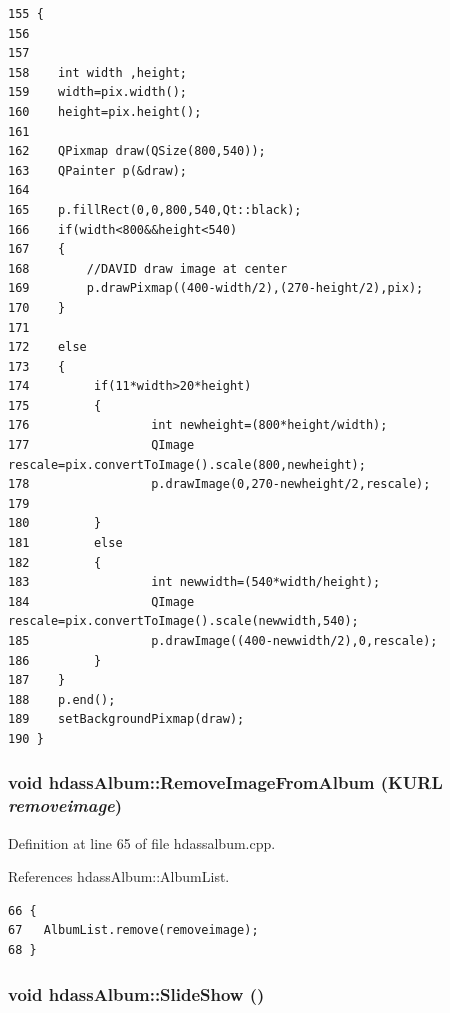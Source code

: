 \footnotesize\begin{verbatim}155 {
156    
157    
158    int width ,height;
159    width=pix.width();
160    height=pix.height();
161    
162    QPixmap draw(QSize(800,540));
163    QPainter p(&draw);
164 
165    p.fillRect(0,0,800,540,Qt::black);
166    if(width<800&&height<540)
167    {
168        //DAVID draw image at center
169        p.drawPixmap((400-width/2),(270-height/2),pix);
170    }
171 
172    else
173    {
174         if(11*width>20*height)
175         {
176                 int newheight=(800*height/width);
177                 QImage rescale=pix.convertToImage().scale(800,newheight);
178                 p.drawImage(0,270-newheight/2,rescale);
179                 
180         } 
181         else
182         {
183                 int newwidth=(540*width/height);
184                 QImage rescale=pix.convertToImage().scale(newwidth,540);
185                 p.drawImage((400-newwidth/2),0,rescale);
186         }
187    }    
188    p.end();
189    setBackgroundPixmap(draw);
190 }
\end{verbatim}\normalsize 
{}
\subsubsection{\setlength{\rightskip}{0pt plus 5cm}void hdass\-Album::Remove\-Image\-From\-Album (KURL {\em removeimage})\hspace{0.3cm}{\tt  [slot, inherited]}}\label{classhdassAlbum_ImageDetiali2}




Definition at line 65 of file hdassalbum.cpp.

References hdass\-Album::Album\-List.



\footnotesize\begin{verbatim}66 {
67   AlbumList.remove(removeimage);
68 }
\end{verbatim}\normalsize 
{}
\subsubsection{\setlength{\rightskip}{0pt plus 5cm}void hdass\-Album::Slide\-Show ()\hspace{0.3cm}{\tt  [inherited]}}\label{classhdassAlbum_ImageDetiala3}




